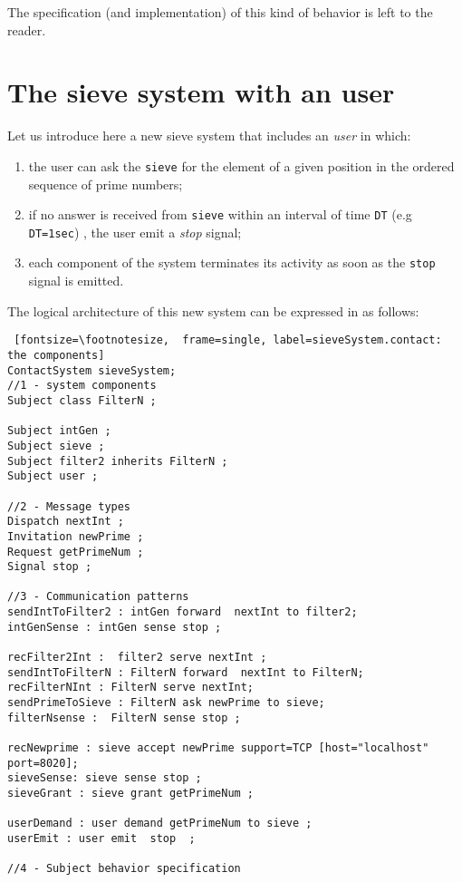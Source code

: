 \documentclass{../llncs}
\begin{document}
The specification (and implementation) of this kind of behavior is left to the reader. 


\newpage
\section{The sieve system with an user}
 
Let us introduce here a new sieve system that includes an \textit{user} in which:

\begin{enumerate}
\item the user can ask the \texttt{sieve} for the element of a given position in the ordered sequence of prime numbers;
\item if no answer is received from \texttt{sieve} within an interval of time \texttt{DT} (e.g \texttt{DT=1sec}) , the user emit a \textit{stop} signal;
\item each component of the system terminates its activity as soon as the \texttt{stop} signal is emitted.
\end{enumerate}


The logical architecture of this new system can be expressed in \contact{} as follows:

\begin{Verbatim} [fontsize=\footnotesize,  frame=single, label=sieveSystem.contact: the components]
ContactSystem sieveSystem;
//1 - system components
Subject class FilterN ;

Subject intGen ;
Subject sieve ;
Subject filter2 inherits FilterN ;
Subject user ;
 
//2 - Message types
Dispatch nextInt ;      
Invitation newPrime ;        
Request getPrimeNum ; 
Signal stop ;

//3 - Communication patterns
sendIntToFilter2 : intGen forward  nextInt to filter2; 
intGenSense : intGen sense stop ;

recFilter2Int :  filter2 serve nextInt ; 				
sendIntToFilterN : FilterN forward  nextInt to FilterN;
recFilterNInt : FilterN serve nextInt; 
sendPrimeToSieve : FilterN ask newPrime to sieve; 		
filterNsense :  FilterN sense stop ; 

recNewprime : sieve accept newPrime support=TCP [host="localhost" port=8020];            
sieveSense: sieve sense stop ;
sieveGrant : sieve grant getPrimeNum ;

userDemand : user demand getPrimeNum to sieve ;
userEmit : user emit  stop  ;

//4 - Subject behavior specification
\end{Verbatim}
\end{document}
